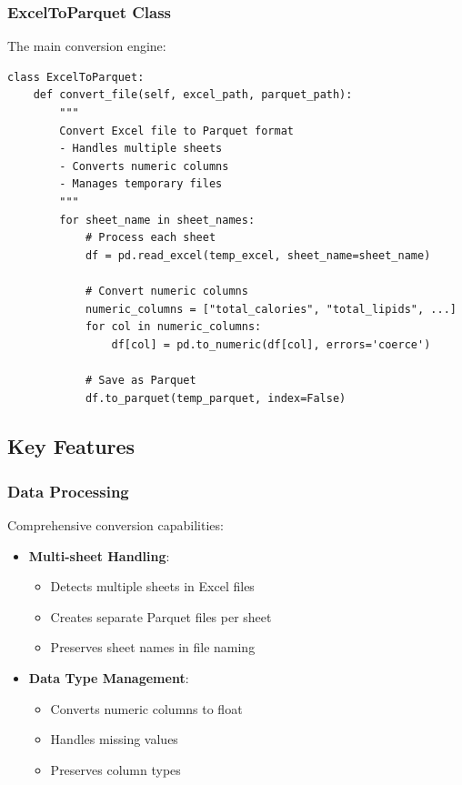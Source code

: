 \subsubsection{ExcelToParquet Class}
The main conversion engine:

\begin{lstlisting}[style=pythonstyle, caption=Excel to Parquet Conversion]
class ExcelToParquet:
    def convert_file(self, excel_path, parquet_path):
        """
        Convert Excel file to Parquet format
        - Handles multiple sheets
        - Converts numeric columns
        - Manages temporary files
        """
        for sheet_name in sheet_names:
            # Process each sheet
            df = pd.read_excel(temp_excel, sheet_name=sheet_name)
            
            # Convert numeric columns
            numeric_columns = ["total_calories", "total_lipids", ...]
            for col in numeric_columns:
                df[col] = pd.to_numeric(df[col], errors='coerce')
                
            # Save as Parquet
            df.to_parquet(temp_parquet, index=False)
\end{lstlisting}

\subsection{Key Features}

\subsubsection{Data Processing}
Comprehensive conversion capabilities:
\begin{itemize}
    \item \textbf{Multi-sheet Handling}:
    \begin{itemize}
        \item Detects multiple sheets in Excel files
        \item Creates separate Parquet files per sheet
        \item Preserves sheet names in file naming
    \end{itemize}
    
    \item \textbf{Data Type Management}:
    \begin{itemize}
        \item Converts numeric columns to float
        \item Handles missing values
        \item Preserves column types
    \end{itemize}
\end{itemize}

